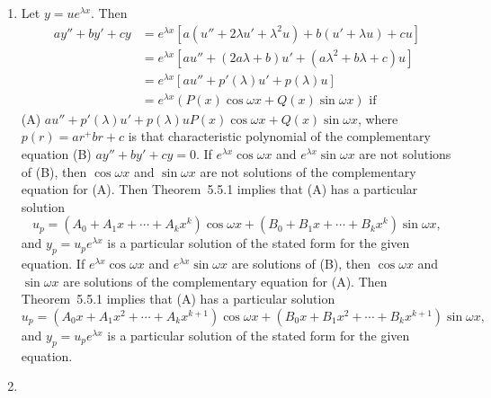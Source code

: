 \documentclass[openany]{book}
\newenvironment{sectionSolutions}{
 \begin{enumerate}[item-label={\thesection.\arabic{enumi}.}]
}{
 \end{enumerate}
}
\begin{document}
\begin{sectionSolutions}
\item
Let $y=ue^{\lambda x}$. Then
\begin{align*}
ay''+by'+cy&=e^{\lambda x}\left[a(u''+2\lambda u'+\lambda^2u)
+b(u'+\lambda u)+cu\right]\\
&=e^{\lambda x}\left[au''+(2a\lambda+b)u'+(a\lambda^2+b\lambda+c)u\right]\\
&=e^{\lambda x}\left[au''+p'(\lambda)u'+p(\lambda)u\right]\\
&=e^{\lambda x}\left(P(x)\cos \omega x+Q(x)\sin \omega x\right)\text{ if}
\end{align*}
(A) $au''+p'(\lambda)u'+p(\lambda)u
P(x)\cos \omega x+Q(x)\sin \omega x$,
where $p(r)=ar^+br+c$ is that characteristic polynomial
of the  complementary equation (B) $ay''+by'+cy=0$.
If $e^{\lambda x}\cos\omega x$ and $e^{\lambda
x}\sin\omega x$ are not solutions of (B), then
$\cos\omega x$ and $\sin\omega x$ are not solutions of the
complementary equation for (A).  Then  Theorem~5.5.1
implies that  (A) has a particular solution
\[
u_p=(A_0+A_1x+\cdots+A_kx^k)\cos\omega x+
(B_0+B_1x+\cdots+B_kx^k)\sin\omega x,
\]
 and $y_p=u_pe^{\lambda x}$
is a particular solution of the stated form for the given equation.
If $e^{\lambda x}\cos\omega x$ and $e^{\lambda
x}\sin\omega x$ are  solutions of (B), then
$\cos\omega x$ and $\sin\omega x$ are solutions of the
complementary equation for (A).  Then  Theorem~5.5.1
implies that  (A) has a particular solution
\[
u_p=(A_0x+A_1x^2+\cdots+A_kx^{k+1})\cos\omega x+
(B_0x+B_1x^2+\cdots+B_kx^{k+1})\sin\omega x,
\]
and $y_p=u_pe^{\lambda x}$ is a particular solution of the stated form
for the given equation.

\item
{}
\end{sectionSolutions}
\end{document}
